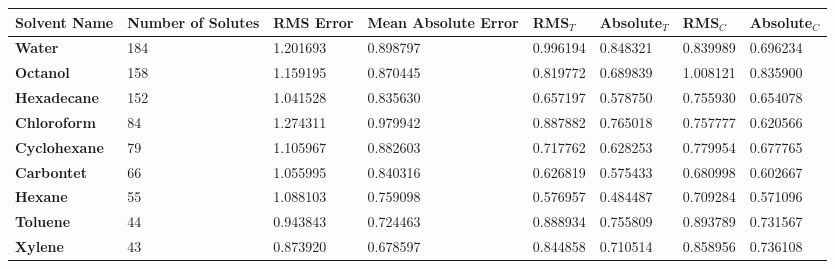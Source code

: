 \documentclass{amsart}
\begin{document}
 
\begin{center}
\begin{tabular}{|l|l|l|l|l|l|l|l|} 
\hline  
\textbf{Solvent Name}&\textbf{Number of Solutes}&\textbf{RMS Error}&\textbf{Mean Absolute Error}&\textbf{RMS$_{T}$}&\textbf{Absolute$_{T}$}&\textbf{RMS$_{C}$}&\textbf{Absolute$_{C}$} \\ \hline
\hline 
\textbf{Water}&184&1.201693&0.898797&0.996194&0.848321&0.839989&0.696234 \\ \hline 
\textbf{Octanol}&158&1.159195&0.870445&0.819772&0.689839&1.008121&0.835900 \\ \hline 
\textbf{Hexadecane}&152&1.041528&0.835630&0.657197&0.578750&0.755930&0.654078 \\ \hline 
\textbf{Chloroform}& 84&1.274311&0.979942&0.887882&0.765018&0.757777&0.620566 \\ \hline 
\textbf{Cyclohexane}& 79&1.105967&0.882603&0.717762&0.628253&0.779954&0.677765 \\ \hline 
\textbf{Carbontet}& 66&1.055995&0.840316&0.626819&0.575433&0.680998&0.602667 \\ \hline 
\textbf{Hexane}& 55&1.088103&0.759098&0.576957&0.484487&0.709284&0.571096 \\ \hline 
\textbf{Toluene}& 44&0.943843&0.724463&0.888934&0.755809&0.893789&0.731567 \\ \hline 
\textbf{Xylene}& 43&0.873920&0.678597&0.844858&0.710514&0.858956&0.736108 \\ \hline 
\end{tabular} 
\end{center} 
\end{document}
